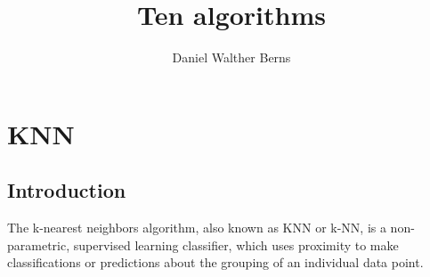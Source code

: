 \documentclass[10pt,a4paper]{article}
\author{Daniel Walther Berns}
\title{Ten algorithms}
\begin{document}
	\maketitle
	\section{KNN}
    
    
    \subsection{Introduction}
    The k-nearest neighbors algorithm, also known as KNN or k-NN, is a non-parametric, supervised learning classifier, which uses proximity to make classifications or predictions about the grouping of an individual data point. 
    
\end{document}
